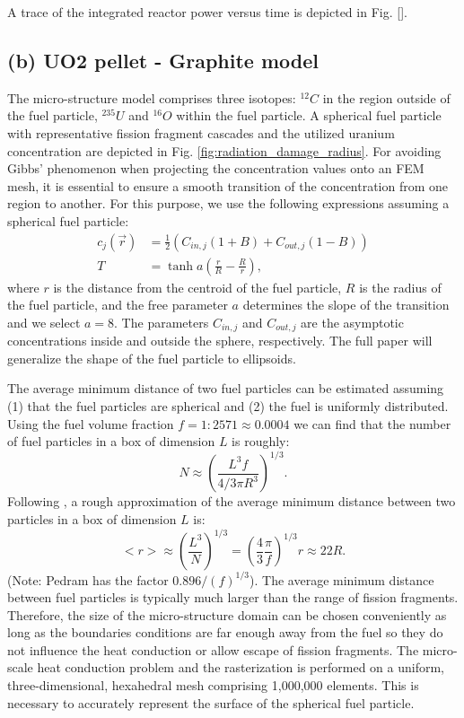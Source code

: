 \documentclass{anstrans}
\begin{document}
A trace of the integrated reactor power versus time is depicted in Fig. \ref{}.

\subsection{(b) UO2 pellet - Graphite model}\label{sec:micro_model}
The micro-structure model comprises three isotopes: $^{12}C$ in the region outside of the fuel particle, $^{235}U$ and $^{16}O$ within the fuel particle. A spherical fuel particle with representative fission fragment cascades and the utilized uranium concentration are depicted in Fig. \ref{fig:radiation_damage_radius}.
For avoiding Gibbs' phenomenon when projecting the concentration values onto an FEM mesh, it is essential to ensure a smooth transition of the concentration from one region to another. For this purpose, we use the following expressions assuming a spherical fuel particle:
\begin{align}\label{eq:smooth_transition}
   c_j(\vec{r})& = \frac{1}{2} \left( C_{in,j}  \left( 1 + B \right) + C_{out,j}\left( 1 -B \right)  \right) \nonumber \\
   T &= \tanh a \left( \frac{r}{R}  - \frac{R}{r} \right),
\end{align}
where $r$ is the distance from the centroid of the fuel particle, $R$ is the radius of the fuel particle, and the free parameter $a$ determines the slope of the transition and we select $a=8$. The parameters $C_{in,j}$ and $C_{out,j}$ are the asymptotic concentrations inside and outside the sphere, respectively. The full paper will generalize the shape of the fuel particle to ellipsoids.

The average minimum distance of two fuel particles can be estimated assuming (1) that the fuel particles are spherical and (2) the fuel is uniformly distributed. Using the fuel volume fraction $f = 1 : 2571 \approx 0.0004$ we can find that the number of fuel particles in a box of dimension $L$ is roughly:
\begin{equation}
  N \approx \left( \frac{L^3 f}{4/3 \pi R^3} \right)^{1/3}.
\end{equation}
Following \cite{averagedistance}, a rough approximation of the average minimum distance between two particles in a box of dimension $L$ is:
\begin{equation}
   <r> \approx \left( \frac{L^3}{N} \right)^{1/3} = \left(\frac{4}{3} \frac{\pi}{f} \right)^{1/3} r \approx 22 R. 
\end{equation}
(Note: Pedram has the factor $0.896/(f)^{1/3}$). The average minimum distance between fuel particles is typically much larger than the range of fission fragments. Therefore, the size of the micro-structure domain can be chosen conveniently as long as the boundaries conditions are far enough away from the fuel so they do not influence the heat conduction or allow escape of fission fragments.
The micro-scale heat conduction problem and the rasterization is performed on a uniform, three-dimensional, hexahedral mesh comprising 1,000,000 elements. This is necessary to accurately represent the surface of the spherical fuel particle.
\end{document}
